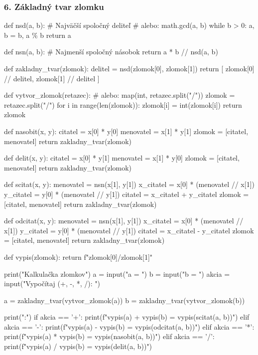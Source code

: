 \subsubsection*{6. Základný tvar zlomku}
\begin{solution}
def nsd(a, b):
    # Najväčší spoločný deliteľ
    # alebo: math.gcd(a, b)
    while b > 0:
        a, b = b, a \% b
    return a

def nsn(a, b):
    # Najmenší spoločný násobok
    return a * b // nsd(a, b)

def zakladny_tvar(zlomok):
    delitel = nsd(zlomok[0], zlomok[1])
    return [
        zlomok[0] // delitel,
        zlomok[1] // delitel
    ]

def vytvor_zlomok(retazec):
    # alebo: map(int, retazec.split("/"))
    zlomok = retazec.split("/")
    for i in range(len(zlomok)):
        zlomok[i] = int(zlomok[i])
    return zlomok

def nasobit(x, y):
    citatel = x[0] * y[0]
    menovatel = x[1] * y[1]
    zlomok = [citatel, menovatel]
    return zakladny_tvar(zlomok)

def delit(x, y):
    citatel = x[0] * y[1]
    menovatel = x[1] * y[0]
    zlomok = [citatel, menovatel]
    return zakladny_tvar(zlomok)

def scitat(x, y):
    menovatel = nsn(x[1], y[1])
    x_citatel = x[0] * (menovatel // x[1])
    y_citatel = y[0] * (menovatel // y[1])
    citatel = x_citatel + y_citatel
    zlomok = [citatel, menovatel]
    return zakladny_tvar(zlomok)

def odcitat(x, y):
    menovatel = nsn(x[1], y[1])
    x_citatel = x[0] * (menovatel // x[1])
    y_citatel = y[0] * (menovatel // y[1])
    citatel = x_citatel - y_citatel
    zlomok = [citatel, menovatel]
    return zakladny_tvar(zlomok)

def vypis(zlomok):
    return f"{zlomok[0]}/{zlomok[1]}"


print("Kalkulačka zlomkov")
a = input("a = ")
b = input("b = ")
akcia = input("Vypočítaj (+, -, *, /): ")

a = zakladny_tvar(vytvor_zlomok(a))
b = zakladny_tvar(vytvor_zlomok(b))

print(":")
if akcia == '+':
    print(f"{vypis(a)} + {vypis(b)} = {vypis(scitat(a, b))}")
elif akcia == '-':
    print(f"{vypis(a)} - {vypis(b)} = {vypis(odcitat(a, b))}")
elif akcia == '*':
    print(f"{vypis(a)} * {vypis(b)} = {vypis(nasobit(a, b))}")
elif akcia == '/':
    print(f"{vypis(a)} / {vypis(b)} = {vypis(delit(a, b))}")
\end{solution}
